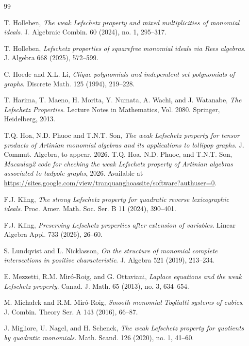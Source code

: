 \documentclass[12pt,twoside]{amsart}
\theoremstyle{definition}
\theoremstyle{mystyle}
\begin{document}
\begin{thebibliography}{99}
	
	

	T. Holleben,
	\emph{The weak Lefschetz property and mixed multiplicities of monomial ideals}.
	J. Algebraic Combin. 60 (2024), no. 1, 295--317.
	
	T. Holleben,
	\emph{Lefschetz properties of squarefree monomial ideals via Rees algebras}.
	J. Algebra 668 (2025), 572--599.
	
	C. Hoede and X.L. Li,
	\emph{Clique polynomials and independent set polynomials of graphs}.
	Discrete Math. 125 (1994), 219--228.

    
	T. Harima, T. Maeno, H. Morita, Y. Numata, A. Wachi, and J. Watanabe,
	\emph{The Lefschetz Properties}.
	Lecture Notes in Mathematics, Vol. 2080.
	Springer, Heidelberg, 2013.
	
	T.Q. Hoa, N.D. Phuoc and T.N.T. Son,
	\emph{The weak Lefschetz property for tensor products of Artinian monomial algebras and its applications to lollipop graphs}.
	J. Commut. Algebra, to appear, 2026.
T.Q. Hoa, N.D. Phuoc, and T.N.T. Son,
\emph{Macaulay2 code for checking the weak Lefschetz property of
Artinian algebras associated to tadpole graphs}, 2026.
Available at
\url{https://sites.google.com/view/tranquanghoassite/software?authuser=0}.

	
	
	F.J. Kling,
	\emph{The strong Lefschetz property for quadratic reverse lexicographic ideals}.
	Proc. Amer. Math. Soc. Ser. B 11 (2024), 390--401.
	
	F.J. Kling,
	\emph{Preserving Lefschetz properties after extension of variables}.
	Linear Algebra Appl. 733 (2026), 26--60.
	
	S. Lundqvist and L. Nicklasson,
	\emph{On the structure of monomial complete intersections in positive characteristic}.
	J. Algebra 521 (2019), 213--234.
	
	E. Mezzetti, R.M. Mir\'o-Roig, and G. Ottaviani,
	\emph{Laplace equations and the weak Lefschetz property}.
	Canad. J. Math. 65 (2013), no. 3, 634--654.
	
	M. Micha{\l}ek and R.M. Mir\'o-Roig,
	\emph{Smooth monomial Togliatti systems of cubics}.
	J. Combin. Theory Ser. A 143 (2016), 66--87.
	
	J. Migliore, U. Nagel, and H. Schenck,
	\emph{The weak Lefschetz property for quotients by quadratic monomials}.
	Math. Scand. 126 (2020), no. 1, 41--60.
	

\end{thebibliography}
\end{document}

